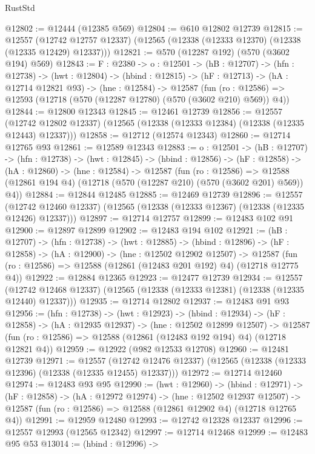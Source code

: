 \begin{lexlean}{RustStd}
\begin{coremodule}
@12802 := @12444 (@12385 @569)
@12804 := @610 @12802 @12739
@12815 := @12557
    (@12742 @12757 @12337)
    (@12565 (@12338 (@12333 @12370) (@12338 (@12335 @12429) @12337)))
@12821 := @570 (@12287 @192) (@570 (@3602 @194) @569)
@12843 := {F : @2380} ->
  {o : @12501} ->
  (hB : @12707) ->
  (hfn : @12738) ->
  (hwt : @12804) ->
  (hbind : @12815) ->
  (hF : @12713) ->
  (hA : @12714 @12821 @93) ->
  (hne : @12584) ->
  @12587 (fun (ro : @12586) => @12593 (@12718 (@570 (@12287 @12780) (@570 (@3602 @210) @569)) @4))
@12844 := @12800 @12343
@12845 := @12461 @12739
@12856 := @12557
    (@12742 @12802 @12337)
    (@12565 (@12338 (@12333 @12384) (@12338 (@12335 @12443) @12337)))
@12858 := @12712 (@12574 @12343)
@12860 := @12714 @12765 @93
@12861 := @12589 @12343
@12883 := {o : @12501} ->
  (hB : @12707) ->
  (hfn : @12738) ->
  (hwt : @12845) ->
  (hbind : @12856) ->
  (hF : @12858) ->
  (hA : @12860) ->
  (hne : @12584) ->
  @12587
    (fun (ro : @12586) =>
    @12588 (@12861 @194 @4) (@12718 (@570 (@12287 @210) (@570 (@3602 @201) @569)) @4))
@12884 := @12844 @12485
@12885 := @12469 @12739
@12896 := @12557
    (@12742 @12460 @12337)
    (@12565 (@12338 (@12333 @12367) (@12338 (@12335 @12426) @12337)))
@12897 := @12714 @12757
@12899 := @12483 @102 @91
@12900 := @12897 @12899
@12902 := @12483 @194 @102
@12921 := (hB : @12707) ->
  (hfn : @12738) ->
  (hwt : @12885) ->
  (hbind : @12896) ->
  (hF : @12858) ->
  (hA : @12900) ->
  (hne : @12502 @12902 @12507) ->
  @12587 (fun (ro : @12586) => @12588 (@12861 (@12483 @201 @192) @4) (@12718 @12775 @4))
@12922 := @12884 @12365
@12923 := @12477 @12739
@12934 := @12557
    (@12742 @12468 @12337)
    (@12565 (@12338 (@12333 @12381) (@12338 (@12335 @12440) @12337)))
@12935 := @12714 @12802
@12937 := @12483 @91 @93
@12956 := (hfn : @12738) ->
  (hwt : @12923) ->
  (hbind : @12934) ->
  (hF : @12858) ->
  (hA : @12935 @12937) ->
  (hne : @12502 @12899 @12507) ->
  @12587 (fun (ro : @12586) => @12588 (@12861 (@12483 @192 @194) @4) (@12718 @12821 @4))
@12959 := @12922 (@982 @12533 @12708)
@12960 := @12481 @12739
@12971 := @12557
    (@12742 @12476 @12337)
    (@12565 (@12338 (@12333 @12396) (@12338 (@12335 @12455) @12337)))
@12972 := @12714 @12460
@12974 := @12483 @93 @95
@12990 := (hwt : @12960) ->
  (hbind : @12971) ->
  (hF : @12858) ->
  (hA : @12972 @12974) ->
  (hne : @12502 @12937 @12507) ->
  @12587 (fun (ro : @12586) => @12588 (@12861 @12902 @4) (@12718 @12765 @4))
@12991 := @12959 @12480
@12993 := @12742 @12328 @12337
@12996 := @12557 @12993 (@12565 @12342)
@12997 := @12714 @12468
@12999 := @12483 @95 @53
@13014 := (hbind : @12996) ->

\end{coremodule}
\end{lexlean}
